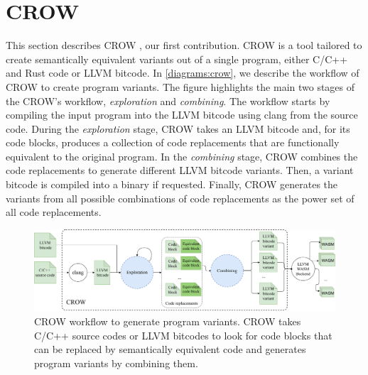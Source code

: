 
\section{CROW}
\label{section:crow}

This section describes CROW \cite{CROW}, our first contribution. CROW is a tool tailored to create semantically equivalent \wasm variants out of a single program, either C/C++ and Rust code or LLVM bitcode.
In \autoref{diagrams:crow}, we describe the workflow of CROW to create program variants.
The figure highlights the main two stages of the CROW's workflow, \textit{exploration} and \textit{combining}. The workflow starts by compiling the input program into the LLVM bitcode using clang from the source code. During the \emph{exploration} stage, CROW takes an LLVM bitcode and, for its code blocks, produces a collection of code replacements that are functionally equivalent to the original program. 
In the \emph{combining} stage, CROW combines the code replacements to generate different LLVM bitcode variants. 
Then, a variant bitcode is compiled into a \wasm binary if requested. Finally, CROW generates the variants from all possible combinations of code replacements as the power set of all code replacements.  


\begin{figure}[h]
    \includegraphics[width=\linewidth]{diagrams/generation/crow.drawio.pdf}
    \caption{CROW workflow to generate program variants. CROW takes C/C++ source codes or LLVM bitcodes to look for code blocks that can be replaced by semantically equivalent code and generates program variants by combining them.}
    \label{diagrams:crow}
\end{figure}





